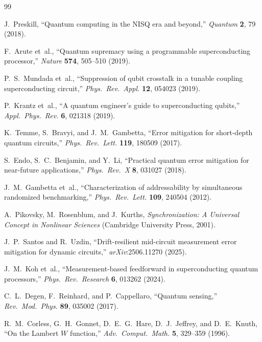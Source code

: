 \documentclass[10pt,twocolumn]{article}
\begin{document}
\begin{thebibliography}{99}

J.~Preskill,
``Quantum computing in the NISQ era and beyond,''
\textit{Quantum} \textbf{2}, 79 (2018).

F.~Arute et~al.,
``Quantum supremacy using a programmable superconducting processor,''
\textit{Nature} \textbf{574}, 505--510 (2019).

P.~S.~Mundada et~al.,
``Suppression of qubit crosstalk in a tunable coupling superconducting circuit,''
\textit{Phys.\ Rev.\ Appl.} \textbf{12}, 054023 (2019).

P.~Krantz et~al.,
``A quantum engineer's guide to superconducting qubits,''
\textit{Appl.\ Phys.\ Rev.} \textbf{6}, 021318 (2019).

K.~Temme, S.~Bravyi, and J.~M.~Gambetta,
``Error mitigation for short-depth quantum circuits,''
\textit{Phys.\ Rev.\ Lett.} \textbf{119}, 180509 (2017).

S.~Endo, S.~C.~Benjamin, and Y.~Li,
``Practical quantum error mitigation for near-future applications,''
\textit{Phys.\ Rev.\ X} \textbf{8}, 031027 (2018).

J.~M.~Gambetta et~al.,
``Characterization of addressability by simultaneous randomized benchmarking,''
\textit{Phys.\ Rev.\ Lett.} \textbf{109}, 240504 (2012).

A.~Pikovsky, M.~Rosenblum, and J.~Kurths,
\textit{Synchronization: A Universal Concept in Nonlinear Sciences}
(Cambridge University Press, 2001).

J.~P.~Santos and R.~Uzdin,
``Drift-resilient mid-circuit measurement error mitigation
for dynamic circuits,''
\textit{arXiv}:2506.11270 (2025).

J.~M.~Koh et~al.,
``Measurement-based feedforward in superconducting quantum processors,''
\textit{Phys.\ Rev.\ Research} \textbf{6}, 013262 (2024).

C.~L.~Degen, F.~Reinhard, and P.~Cappellaro,
``Quantum sensing,''
\textit{Rev.\ Mod.\ Phys.} \textbf{89}, 035002 (2017).

R.~M.~Corless, G.~H.~Gonnet, D.~E.~G.~Hare, D.~J.~Jeffrey, and D.~E.~Knuth,
``On the Lambert $W$ function,''
\textit{Adv.\ Comput.\ Math.} \textbf{5}, 329--359 (1996).


\end{thebibliography}
\end{document}
